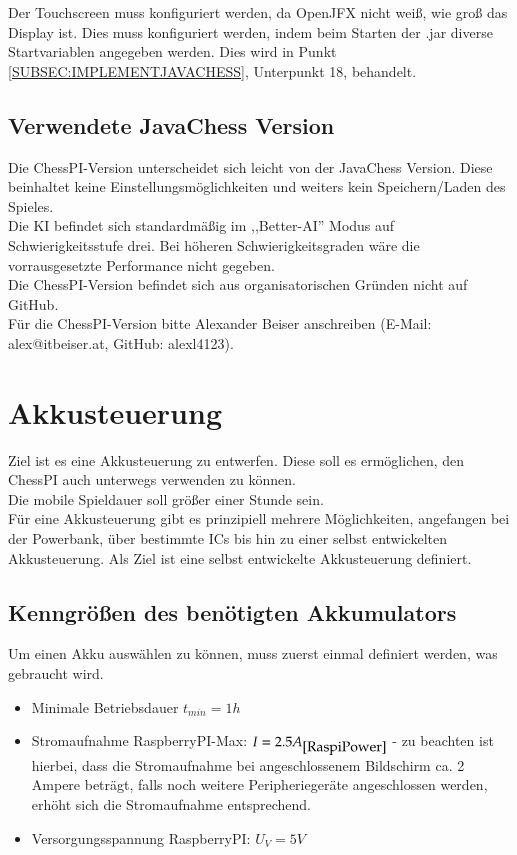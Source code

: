 \documentclass[12pt,a4paper]{article}
\begin{document}
{Der Touchscreen muss konfiguriert werden, da OpenJFX nicht weiß, wie groß das Display ist. Dies muss konfiguriert werden, indem beim Starten der .jar diverse Startvariablen angegeben werden. Dies wird in Punkt \ref{SUBSEC:IMPLEMENTJAVACHESS}, Unterpunkt 18, behandelt.

\subsection{Verwendete JavaChess Version}
\label{SUBSEC:USEDJAVACHESS}

Die ChessPI-Version unterscheidet sich leicht von der JavaChess Version. Diese beinhaltet keine Einstellungsmöglichkeiten und weiters kein Speichern/Laden des Spieles.\\
Die KI befindet sich standardmäßig im ,,Better-AI'' Modus auf Schwierigkeitsstufe drei. Bei höheren Schwierigkeitsgraden wäre die vorrausgesetzte Performance nicht gegeben.\\[2ex]
Die ChessPI-Version befindet sich aus organisatorischen Gründen nicht auf GitHub. \\Für die ChessPI-Version bitte Alexander Beiser anschreiben (E-Mail: alex@itbeiser.at, GitHub: alexl4123).

\clearpage\vfill\newpage{}
\section{Akkusteuerung}
\label{SEC:AKKUSTEUR}

Ziel ist es eine Akkusteuerung zu entwerfen. Diese soll es ermöglichen, den ChessPI auch unterwegs verwenden zu können. \\
Die mobile Spieldauer soll größer einer Stunde sein. \\[1ex]
Für eine Akkusteuerung gibt es prinzipiell mehrere Möglichkeiten, angefangen bei der Powerbank, über bestimmte ICs bis hin zu einer selbst entwickelten Akkusteuerung. Als Ziel ist eine selbst entwickelte Akkusteuerung definiert.\\

\subsection{Kenngrößen des benötigten Akkumulators}
\label{SUBSEC:AKKU-NEEDS}

Um einen Akku auswählen zu können, muss zuerst einmal definiert werden, was gebraucht wird.\\
\begin{itemize}
	\item{Minimale Betriebsdauer $t_{min}= 1h$}
	\item{Stromaufnahme RaspberryPI-Max: $I=2.5A_{\cite{RaspiPower}}$ - zu beachten ist hierbei, dass die Stromaufnahme bei angeschlossenem Bildschirm ca. 2 Ampere beträgt, falls noch weitere Peripheriegeräte angeschlossen werden, erhöht sich die Stromaufnahme entsprechend.}
	\item{Versorgungsspannung RaspberryPI: $U_V = 5V$}
\end{itemize}

}
\end{document}

